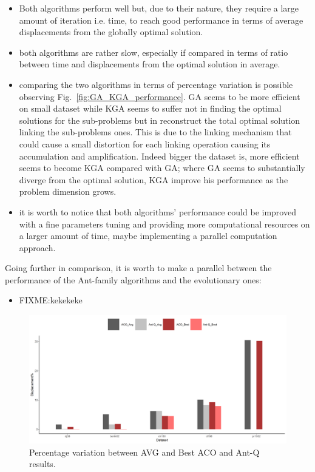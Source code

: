 \documentclass[10pt]{article}
\begin{document}
\begin{itemize}
\item Both algorithms perform well but, due to their nature, they require a large amount of iteration i.e. time, to reach good performance in terms of average displacements from the globally optimal solution.
\item both algorithms are rather slow, especially if compared in terms of ratio between time and displacements from the optimal solution in average.
\item comparing the two algorithms in terms of percentage variation is possible observing Fig.~\ref{fig:GA_KGA_performance}. GA seems to be more efficient on small dataset while KGA seems to suffer not in finding the optimal solutions for the sub-problems but in reconstruct the total optimal solution linking the sub-problems ones. This is due to the linking mechanism that could cause a small distortion for each linking operation causing its accumulation and amplification. Indeed bigger the dataset is, more efficient seems to become KGA compared with GA; where GA seems to substantially diverge from the optimal solution, KGA improve his performance as the problem dimension grows.
\item it is worth to notice that both algorithms' performance could be improved with a fine parameters tuning and providing more computational resources on a larger amount of time, maybe implementing a parallel computation approach. 
\end{itemize}
Going further in comparison, it is worth to make a parallel between the performance of the Ant-family algorithms and the evolutionary ones:
\begin{itemize}
\item FIXME:kekekeke
\end{itemize}
\begin{figure}
\centering \includegraphics[scale=0.5]{figs/ACO_Ant-Q_avg_best.png}
\caption{\label{fig:aco-comparison} Percentage variation between AVG and Best ACO and Ant-Q results.}
\end{figure}
\end{document}
